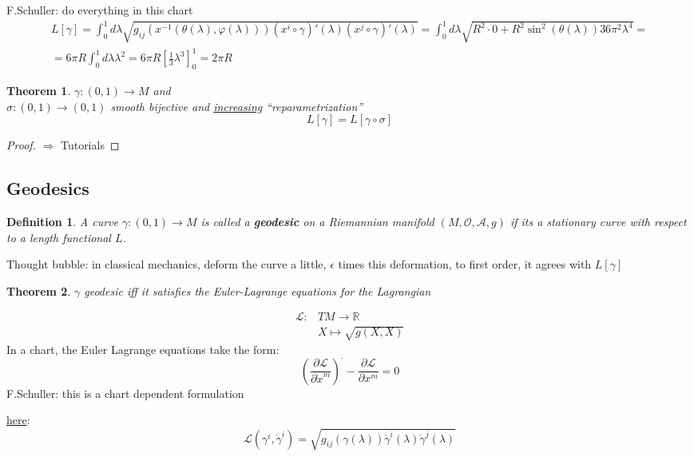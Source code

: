 \documentclass[10pt, twoside]{amsart}
\newtheorem{theorem}{Theorem}
\newtheorem{definition}{Definition}
\begin{document}
\begin{multicols*}{2}
F.Schuller: do everything in this chart
\[
\begin{gathered}
L[\gamma] = \int_0^1 d\lambda \sqrt{ g_{ij}(x^{-1}(\theta(\lambda) , \varphi(\lambda)))(x^i\circ \gamma)'(\lambda)(x^j\circ \gamma)'(\lambda) } = \int_0^1 d\lambda \sqrt{ R^2 \cdot 0 + R^2\sin^2{(\theta(\lambda))} 36 \pi^2 \lambda^4 } = \\
= 6\pi R \int_0^1 d\lambda \lambda^2 = 6\pi R [ \frac{1}{3} \lambda^3 ]^1_0 = 2\pi R
\end{gathered}
\]

\begin{theorem}
  $\gamma: (0,1) \to M$ and \\
$\sigma:(0,1) \to (0,1)$ smooth bijective and \underline{increasing} ``reparametrization''
\[
L[\gamma] = L[\gamma \circ \sigma]
\]
\end{theorem}
\begin{proof}
  $\Longrightarrow $ Tutorials
\end{proof}

\subsection{Geodesics}

\begin{definition}
  A curve $\gamma:(0,1) \to M$ is called a \textbf{geodesic} on a Riemannian manifold $(M,\mathcal{O}, \mathcal{A}, g)$ if its a \emph{stationary} curve with respect to a length functional $L$.  
\end{definition}

Thought bubble: in classical mechanics, deform the curve a little, $\epsilon$ times this deformation, to first order, it agrees with $L[\gamma]$

\begin{theorem}
  $\gamma$ geodesic iff it satisfies the Euler-Lagrange equations for the Lagrangian
\end{theorem}

\[
\begin{aligned}
\mathcal{L}:& TM \to \mathbb{R} \\
& X \mapsto \sqrt{g(X,X)} \end{aligned}
\]
In a chart, the Euler Lagrange equations take the form:
\[
 \left( \frac{ \partial \mathcal{L}}{  \partial \dot{x}^m } \right)^{\cdot} - \frac{ \partial \mathcal{L}}{ \partial x^m} = 0 
\]
F.Schuller: this is a chart dependent formulation

\underline{here}: 
\[
\mathcal{L}(\gamma^i , \dot{\gamma}^i ) = \sqrt{ g_{ij}(\gamma(\lambda)) \dot{\gamma}^i(\lambda) \dot{\gamma}^j(\lambda)}
\]


\end{multicols*}
\end{document}
